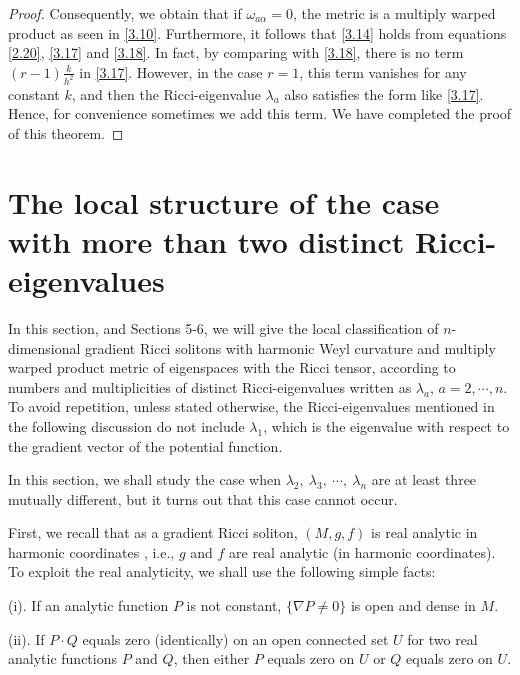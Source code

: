 \documentclass{amsart}
\theoremstyle{definition}
\theoremstyle{remark}
\numberwithin{equation}{section}
\begin{document}
\begin{proof}
		Consequently, we obtain that if $\omega_{a\alpha}=0$, the metric is a multiply warped product as seen in \eqref{3.10}. 
		Furthermore, it follows that \eqref{3.14} holds from equations \eqref{2.20}, \eqref{3.17} and \eqref{3.18}. 
		In fact, by comparing with \eqref{3.18}, there is no term $( r-1)\frac{k}{h^2}$ in \eqref{3.17}. 
		However, in the case $r=1$, this term vanishes for any constant $k$, and then the Ricci-eigenvalue $\lambda_{a}$ also satisfies the form like \eqref{3.17}.
		Hence, for convenience sometimes we add this term. We have completed the proof of this theorem.
	\end{proof}

	
	\section{The local structure  of the case with more than two distinct Ricci-eigenvalues}
	In this section, and Sections 5-6, we will give the local classification of $n$-dimensional gradient Ricci solitons with harmonic Weyl curvature and multiply warped product metric of eigenspaces with the Ricci tensor, according to numbers and multiplicities of distinct Ricci-eigenvalues written as $\lambda_a$, $a=2,\cdots, n$.
	To avoid repetition, unless stated otherwise, the Ricci-eigenvalues mentioned in the following discussion do not include $\lambda_1$, which is the eigenvalue with respect to the gradient vector of the potential function.

	In this section, we shall study the case when $\lambda_2,~\lambda_3,~\cdots,~\lambda_n$ are at least three mutually different, but it turns out that this case cannot occur.
    
			\smallskip
	First, we recall that as a gradient Ricci soliton, $(M,g,f)$ is real analytic in harmonic coordinates \cite{Iv}, i.e., $g$ and $f$ are real analytic (in harmonic coordinates).
	To exploit the real analyticity, we shall use the following simple facts:
	
	{\rm (i).} 
	If an analytic function $P$ is not constant, $\{ \nabla P \neq 0  \}$ is open and dense in $M$. 
	
	{\rm (ii).} 
	If $P \cdot Q$ equals zero (identically) on an open connected set $U$ for two real analytic functions $P$ and $Q$, 
	then either $P$ equals zero on $U$ or $Q$ equals zero on $U$.
	
\end{document}
